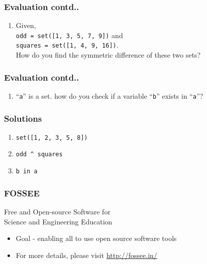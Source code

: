 \documentclass[17pt,compress]{beamer}
\newcounter{saveenumi}
\newcommand{\seti}{\setcounter{saveenumi}{\value{enumi}}}
\newcommand{\conti}{\setcounter{enumi}{\value{saveenumi}}}
\begin{document}
\begin{frame}
\frametitle{Evaluation contd..}
\label{sec-6.2}

\begin{enumerate}
\conti
\item Given, \\ \texttt{odd = set([1, 3, 5, 7, 9])} and \\\texttt{squares = set([1, 4, 9, 16])}. \pause\\
    How do you find the symmetric difference of these two sets?
\seti
\end{enumerate}
\end{frame}
\begin{frame}
\frametitle{Evaluation contd..}
\label{sec-6.3}

\begin{enumerate}
\conti
\item ``\texttt{a}'' is a set. how do you check if a variable ``\texttt{b}'' exists in ``\texttt{a}''?
\end{enumerate}
\end{frame}
\begin{frame}
\frametitle{Solutions}
\label{sec-7}

\begin{enumerate}
\item \texttt{set([1, 2, 3, 5, 8])}\pause
\vspace{12pt}
\item \texttt{odd \^{} squares}\pause
\vspace{12pt}
\item \texttt{b in a}
\end{enumerate}
\end{frame}
\begin{frame}
\frametitle{FOSSEE}
{\color{blue}Free and Open-source Software for \\Science and Engineering Education} \\
\begin{itemize}
\item Goal - enabling all to use open source software tools
\item For more details, please visit {\color{blue}\url{http://fossee.in/}}
\end{itemize}
\end{frame}
\end{document}
